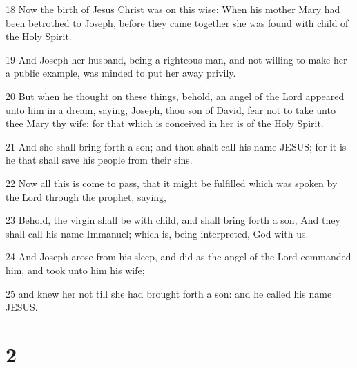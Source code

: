 \par 18 Now the birth of Jesus Christ was on this wise: When his mother Mary had been betrothed to Joseph, before they came together she was found with child of the Holy Spirit.
\par 19 And Joseph her husband, being a righteous man, and not willing to make her a public example, was minded to put her away privily.
\par 20 But when he thought on these things, behold, an angel of the Lord appeared unto him in a dream, saying, Joseph, thou son of David, fear not to take unto thee Mary thy wife: for that which is conceived in her is of the Holy Spirit.
\par 21 And she shall bring forth a son; and thou shalt call his name JESUS; for it is he that shall save his people from their sins.
\par 22 Now all this is come to pass, that it might be fulfilled which was spoken by the Lord through the prophet, saying,
\par 23 Behold, the virgin shall be with child, and shall bring forth a son, And they shall call his name Immanuel; which is, being interpreted, God with us.
\par 24 And Joseph arose from his sleep, and did as the angel of the Lord commanded him, and took unto him his wife;
\par 25 and knew her not till she had brought forth a son: and he called his name JESUS.

\chapter{2}

